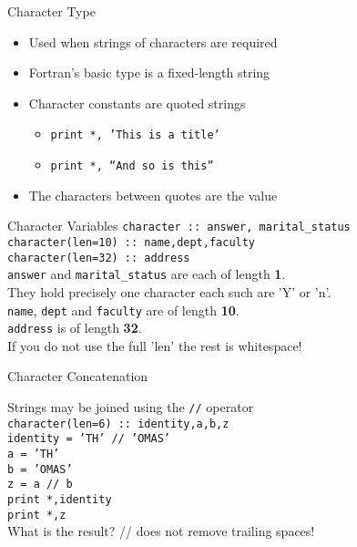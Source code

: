 \documentclass{beamer}
\begin{document}
\begin{frame}{Character Type}
  \begin{itemize}
    \item Used when strings of characters are required
    \vfill\item Fortran's basic type is a fixed-length string
    \vfill\item Character constants are quoted strings
    \begin{itemize}
      \item \texttt{print *, 'This is a title'}
      \item \texttt{print *, ``And so is this''}
    \end{itemize}
    \vfill\item The characters between quotes are the value
  \end{itemize}
\end{frame}
\begin{frame}{Character Variables}
\texttt{character :: answer, marital\_status} \\
\texttt{character(len=10) :: name,dept,faculty} \\
\texttt{character(len=32) :: address} \\
\vfill
\texttt{answer} and \texttt{marital\_status} are each of length \textbf{1}. \\
They hold precisely one character each such are 'Y' or 'n'. \\
\vfill
\texttt{name}, \texttt{dept} and \texttt{faculty} are of length \textbf{10}. \\
\texttt{address} is of length \textbf{32}. \\
\vfill
{\color{red}If you do not use the full 'len' the rest is whitespace!}
\end{frame}
\begin{frame}{Character Concatenation}
  
  Strings may be joined using the \texttt{//} operator \\
\vfill
  \texttt{character(len=6) :: identity,a,b,z \\
    identity = 'TH' // 'OMAS' \\
    a = 'TH' \\
    b = 'OMAS' \\
    z = a // b \\
    print *,identity \\
    print *,z \\
  }
\vfill
What is the result?
\vfill
// does not remove trailing spaces!
\end{frame}
\end{document}
